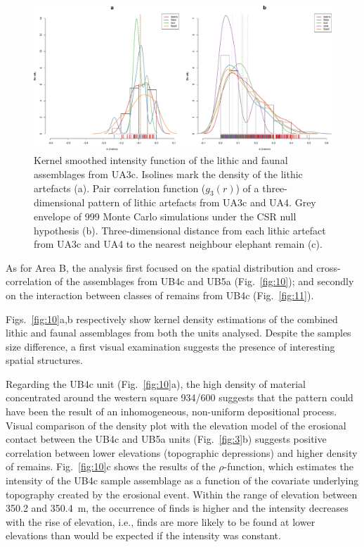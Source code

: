 \documentclass[preprint,authoryear,times]{elsarticle} %
\begin{document}
\begin{figure}[]
  \centering
  \includegraphics[width=1\textwidth]{../artwork/Fig9.pdf}
  \caption{Kernel smoothed intensity function of the lithic and faunal assemblages from UA3c. Isolines mark the density of the lithic artefacts (a). Pair correlation function ($g_3(r)$) of a three-dimensional pattern of lithic artefacts from UA3c and UA4. Grey envelope of 999 Monte Carlo simulations under the CSR null hypothesis (b). Three-dimensional distance from each lithic artefact from UA3c and UA4 to the nearest neighbour elephant remain (c).}
  \label{fig:9}
\end{figure}


As for Area B, the analysis first focused on the spatial distribution and cross-correlation of the assemblages from UB4c and UB5a (Fig.~\ref{fig:10}); and secondly on the interaction between classes of remains from UB4c (Fig.~\ref{fig:11}).

Figs.~\ref{fig:10}a,b respectively show kernel density estimations of the combined lithic and faunal assemblages from both the units analysed. Despite the samples size difference, a first visual examination suggests the presence of interesting spatial structures.

Regarding the UB4c unit (Fig.~\ref{fig:10}a), the high density of material concentrated around the western square 934/600 suggests that the pattern could have been the result of an inhomogeneous, non-uniform depositional process. Visual comparison of the density plot with the elevation model of the erosional contact between the UB4c and UB5a units (Fig.~\ref{fig:3}b) suggests positive correlation between lower elevations (topographic depressions) and higher density of remains. Fig.~\ref{fig:10}c shows the results of the $\rho$-function, which estimates the intensity of the UB4c sample assemblage as a function of the covariate underlying topography created by the erosional event. Within the range of elevation between 350.2 and 350.4~m, the occurrence of finds is higher and the intensity decreases with the rise of elevation, i.e., finds are more likely to be found at lower elevations than would be expected if the intensity was constant.
\end{document}
